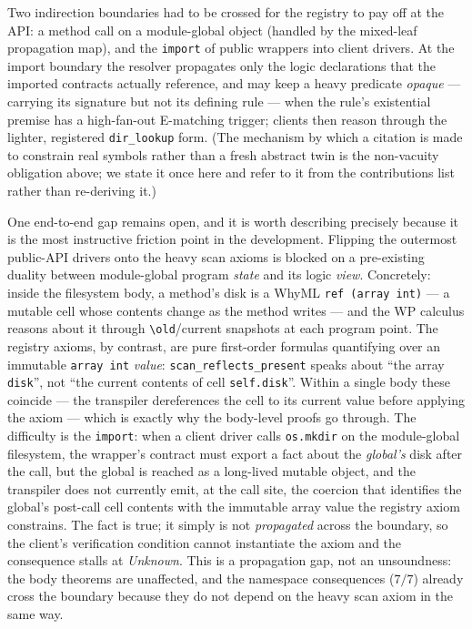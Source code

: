 \documentclass[11pt]{article}
\newcommand{\whyml}{\textsf{WhyML}}
\begin{document}
Two indirection boundaries had to be crossed for the registry to pay off at
the API: a method call on a module-global object (handled by the mixed-leaf
propagation map), and the \texttt{import} of public wrappers into client
drivers. At the import boundary the resolver propagates only the logic
declarations that the imported contracts actually reference, and may keep a
heavy predicate \emph{opaque} --- carrying its signature but not its defining
rule --- when the rule's existential premise has a high-fan-out E-matching
trigger; clients then reason through the lighter, registered
\texttt{dir\_lookup} form. (The mechanism by which a citation is made to
constrain real symbols rather than a fresh abstract twin is the non-vacuity
obligation above; we state it once here and refer to it from the contributions
list rather than re-deriving it.)

One end-to-end gap remains open, and it is worth describing precisely because
it is the most instructive friction point in the development. Flipping the
outermost public-API drivers onto the heavy scan axioms is blocked on a
pre-existing duality between module-global program \emph{state} and its logic
\emph{view}. Concretely: inside the filesystem body, a method's disk is a
\whyml{} \texttt{ref (array int)} --- a mutable cell whose contents change as
the method writes --- and the WP calculus reasons about it through
\texttt{\textbackslash old}/current snapshots at each program point. The
registry axioms, by contrast, are pure first-order formulas quantifying over an
immutable \texttt{array int} \emph{value}: \texttt{scan\_reflects\_present}
speaks about ``the array \texttt{disk}'', not ``the current contents of cell
\texttt{self.disk}''. Within a single body these coincide --- the transpiler
dereferences the cell to its current value before applying the axiom --- which
is exactly why the body-level proofs go through. The difficulty is the
\texttt{import}: when a client driver calls \texttt{os.mkdir} on the
module-global filesystem, the wrapper's contract must export a fact about the
\emph{global's} disk after the call, but the global is reached as a long-lived
mutable object, and the transpiler does not currently emit, at the call site,
the coercion that identifies the global's post-call cell contents with the
immutable array value the registry axiom constrains. The fact is true; it
simply is not \emph{propagated} across the boundary, so the client's
verification condition cannot instantiate the axiom and the consequence stalls
at \emph{Unknown}. This is a propagation gap, not an unsoundness: the body
theorems are unaffected, and the namespace consequences ($7/7$) already cross
the boundary because they do not depend on the heavy scan axiom in the same
way.
\end{document}

